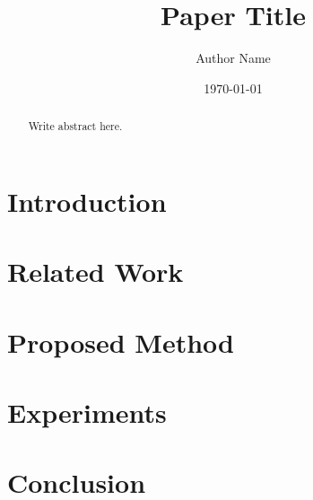 \documentclass[a4paper,12pt]{article}
\title{Paper Title}
\author{Author Name}
\date{\today}
\begin{document}
\maketitle

\begin{abstract}
Write abstract here.
\end{abstract}

\section{Introduction}

\section{Related Work}

\section{Proposed Method}

\section{Experiments}

\section{Conclusion}

\printbibliography
\end{document}
